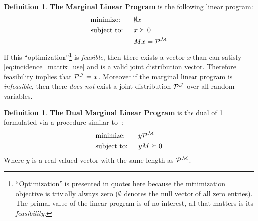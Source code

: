 \documentclass[aps, 10pt, english, twoside, pra, nofootinbib, longbibliography]{revtex4-1}
\theoremstyle{plain}
\theoremstyle{definition}
\newtheorem{definition}[theorem]{Definition}
\theoremstyle{remark}
\newcommand{\mscenario}{\mathcal{M}}
\newcommand{\jointvar}{\mathcal{J}}
\newcommand{\term}[1]{\textcolor{Mahogany}{\textbf{#1}}}
\newcommand{\tcdot}{} %
\begin{document}
    \begin{definition}
        \label{def:marginal_linear_program}
        \term{The Marginal Linear Program} is the following linear program:
        \begin{alignat*}{2}
            & \text{minimize:} \quad&& \emptyset \tcdot x\\
            & \text{subject to:} && x \succeq 0 \\
            & && M \tcdot x = \probvec^{\mscenario}
        \end{alignat*}
        If this ``optimization''\footnote{``Optimization'' is presented in quotes here because the minimization objective is trivially always zero ($\emptyset$ denotes the null vector of all zero entries). The primal value of the linear program is of no interest, all that matters is its \textit{feasibility}.} is \textit{feasible}, then there exists a vector $x$ than can satisfy \cref{eq:incidence_matrix_use} and is a valid joint distribution vector. Therefore feasibility implies that $\probvec^{\jointvar} = x$. Moreover if the marginal linear program is \textit{infeasible}, then there \textit{does not} exist a joint distribution $\probvec^{\jointvar}$ over all random variables.
    \end{definition}
    \begin{definition}
        \label{def:dual_marginal_linear_program}
        \term{The Dual Marginal Linear Program} is the dual of \cref{def:marginal_linear_program} formulated via a procedure similar to~\cite{Lahaie_2008}:
        \begin{alignat*}{2}
            & \text{minimize:} \quad&& y \tcdot \probvec^{\mscenario}\\
            & \text{subject to:} && y \tcdot M \succeq 0
        \end{alignat*}
        Where $y$ is a real valued vector with the same length as $\probvec^{\mscenario}$.
    \end{definition}
\end{document}
